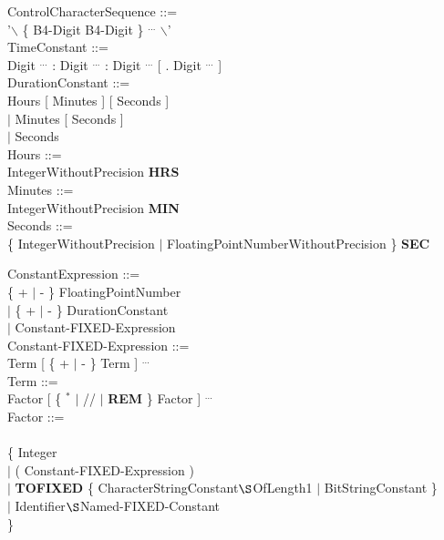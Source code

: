 ControlCharacterSequence ::= \\
\x '$\backslash$ \{ B4-Digit B4-Digit \} $^{...}$ $\backslash$'\\

TimeConstant ::=\\
\x Digit $^{...}$ : Digit $^{...}$ : Digit $^{...}$ [ . Digit $^{...}$ ] \\

DurationConstant ::=\\
\x Hours [ Minutes ] [ Seconds ]\\
\x $\mid$ Minutes [ Seconds ]\\
\x $\mid$ Seconds\\

Hours ::=\\
\x IntegerWithoutPrecision {\bf HRS}\\

Minutes ::=\\
\x IntegerWithoutPrecision {\bf MIN}\\

Seconds ::=\\
\x \{ IntegerWithoutPrecision $\mid$ FloatingPointNumberWithoutPrecision \} {\bf SEC}

ConstantExpression ::=\\
\{ + $\mid$ - \}  FloatingPointNumber\\
\x $\mid$ \{ + $\mid$ - \} DurationConstant\\
\x $\mid$ Constant-FIXED-Expression\\

Constant-FIXED-Expression ::=\\
\x Term [ \{ + $\mid$ - \} Term ] $^{...}$\\
        
Term ::= \\
\x Factor [ \{ $^*$ $\mid$ // $\mid$ {\bf REM} \} Factor ] $^{...}$\\

Factor ::= \\
\x [ + $\mid$ - ] \\
\x \{ Integer\\
\x \x $\mid$ ( Constant-FIXED-Expression )\\
\x \x $\mid$ {\bf TOFIXED} \{ CharacterStringConstant$\S $OfLength1 $\mid$ BitStringConstant \}\\
\x \x $\mid$ Identifier$\S $Named-FIXED-Constant\\
\x \} \\

